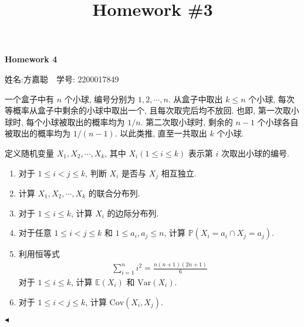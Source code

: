 \documentclass[11pt]{article}
\title{Homework \#3}
\newenvironment{problem}[2][Problem]{\begin{trivlist}
    \item[\hskip \labelsep {\bfseries #1}\hskip \labelsep {\bfseries #2.}]\songti}{\hfill$\blacktriangleleft$\end{trivlist}}
\newcommand\1{\mathds{1}}
\newcommand\E{\mathbb{E}}
\newcommand\PP{\mathbb{P}}
\newcommand\Var{\mathrm{Var}}
\newcommand\Cov{\mathrm{Cov}}
\begin{document}
\kaishu

\pagestyle{fancy}
\chead{}
\fancyfoot[R]{} 
\fancyfoot[C]{\thepage\ /\ \pageref{LastPage} \\ \textcolor{lightgray}{最后编译时间: \today}}


\begin{center}
    {\LARGE \bf Homework 4}

    {姓名:方嘉聪\ \  学号: 2200017849}            %
\end{center}

\begin{problem}{1}
    一个盒子中有 $n$ 个小球, 编号分别为 $1,2, \cdots, n$. 从盒子中取出 $k\le n$ 个小球, 每次等概率从盒子中剩余的小球中取出一个, 且每次取完后均不放回. 也即, 第一次取小球时, 每个小球被取出的概率均为 $1/n$. 第二次取小球时, 剩余的 $n-1$ 个小球各自被取出的概率均为 $1/(n-1)$. 以此类推, 直至一共取出 $k$ 个小球. 
    
    定义随机变量 $X_1, X_2, \cdots, X_k$, 其中 $X_i (1\le i\le k)$ 表示第 $i$ 次取出小球的编号.
    \begin{enumerate}[label=(\arabic*)]
        \item 对于 $1\le i < j \le k$, 判断 $X_i$ 是否与 $X_j$ 相互独立.
        \item 计算 $X_1, X_2, \cdots, X_k$ 的联合分布列.
        \item 对于 $1\le i\le k$, 计算 $X_i$ 的边际分布列.
        \item 对于任意 $1\le i < j \le k$ 和 $1\le a_i,a_j \le n$, 计算 $\PP(X_i = a_i \cap X_j = a_j)$.
        \item 利用恒等式 \begin{align*}
            \sum_{i=1}^{n} i^2 = \frac{n(n+1)(2n+1)}{6}
        \end{align*}
        对于 $1\le i\le k$, 计算 $\E(X_i)$ 和 $\Var(X_i)$.
        \item 对于 $1\le i < j \le k$, 计算 $\Cov(X_i, X_j)$.
    \end{enumerate}
\end{problem}
\end{document}
